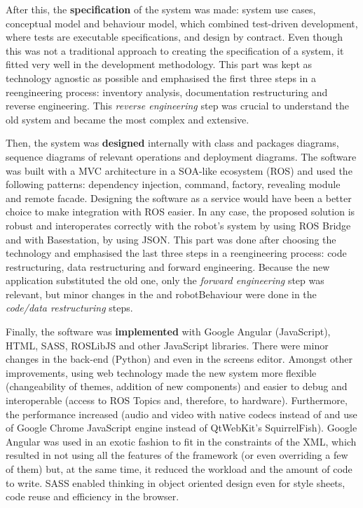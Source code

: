 After this, the \textbf{specification} of the system was made: system use cases, conceptual model and behaviour model, which combined test-driven development, where tests are executable specifications, and design by contract.
Even though this was not a traditional approach to creating the specification of a system, it fitted very well in the development methodology.
This part was kept as technology agnostic as possible and emphasised the first three steps in a reengineering process: inventory analysis, documentation restructuring and reverse engineering.
This \emph{reverse engineering} step was crucial to understand the old system and became the most complex and extensive.

Then, the system was \textbf{designed} internally with class and packages diagrams, sequence diagrams of relevant operations and deployment diagrams.
The software was built with a \ac{MVC} architecture in a \ac{SOA}-like ecosystem (\ac{ROS}) and used the following patterns: dependency injection, command, factory, revealing module and remote facade.
Designing the software as a service would have been a better choice to make integration with \ac{ROS} easier.
In any case, the proposed solution is robust and interoperates correctly with the robot's system by using ROS Bridge and with Basestation, by using JSON.
This part was done after choosing the technology and emphasised the last three steps in a reengineering process: code restructuring, data restructuring and forward engineering.
Because the new application substituted the old one, only the \emph{forward engineering} step was relevant, but minor changes in the \flangobe and robotBehaviour were done in the \emph{code/data restructuring} steps.

Finally, the software was \textbf{implemented} with Google Angular (JavaScript), \ac{HTML}, \ac{SASS}, ROSLibJS and other JavaScript libraries.
There were minor changes in the back-end (Python) and even in the screens editor.
Amongst other improvements, using web technology made the new system more flexible (changeability of themes, addition of new components) and easier to debug and interoperable (access to ROS Topics and, therefore, to hardware).
Furthermore, the performance increased (audio and video with native codecs instead of \flash and use of Google Chrome JavaScript engine instead of QtWebKit's SquirrelFish).
Google Angular was used in an exotic fashion to fit in the constraints of the \ac{XML}, which resulted in not using all the features of the framework (or even overriding a few of them) but, at the same time, it reduced the workload and the amount of code to write.
\ac{SASS} enabled thinking in object oriented design even for style sheets, code reuse and efficiency in the browser.

